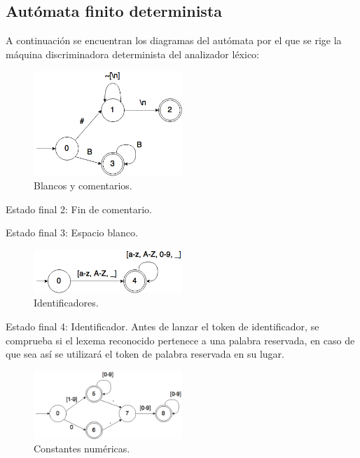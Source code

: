 \documentclass[11pt]{article}
\begin{document}
\subsection{Autómata finito determinista}

A continuación se encuentran los diagramas del autómata por el que se rige la máquina discriminadora determinista
del analizador léxico:

\begin{figure}[H]
\centering
\includegraphics[width=0.5\textwidth]{./DiagramasAutomata/img/BlancosYComentarios.png}
\caption{Blancos y comentarios.} \label{fig:blancosycomentarios}
\end{figure}

Estado final 2: Fin de comentario.

Estado final 3: Espacio blanco.

\begin{figure}[H]
\centering
\includegraphics[width=0.5\textwidth]{./DiagramasAutomata/img/Identificadores.png}
\caption{Identificadores.} \label{fig:ident}
\end{figure}

Estado final 4: Identificador. Antes de lanzar el token de identificador, se comprueba si el lexema reconocido pertenece a
una palabra reservada, en caso de que sea así se utilizará el token de palabra reservada en su lugar.

\begin{figure}[H]
\centering
\includegraphics[width=0.5\textwidth]{./DiagramasAutomata/img/NumerosBueno.png}
\caption{Constantes numéricas.} \label{fig:números}
\end{figure}
\end{document}
